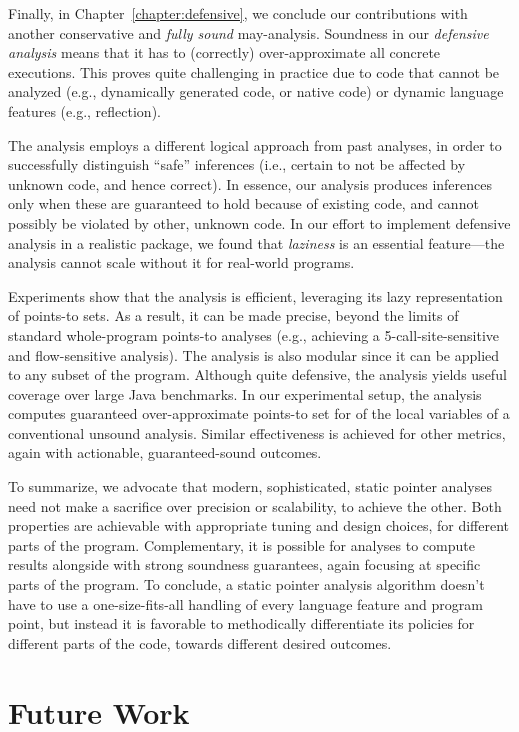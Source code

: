 Finally, in Chapter~\ref{chapter:defensive}, we conclude our contributions with another conservative and \emph{fully sound} may-analysis. Soundness in our \emph{defensive analysis} means that it has to (correctly) over-approximate all concrete executions. This proves quite challenging in practice due to code that cannot be analyzed (e.g., dynamically generated code, or native code) or dynamic language features (e.g., reflection).

The analysis employs a different logical approach from past analyses, in order to successfully distinguish ``safe'' inferences (i.e., certain to not be affected by unknown code, and hence correct).  In essence, our analysis produces inferences only when these are guaranteed to hold because of existing code, and cannot possibly be violated by other, unknown code. In our effort to implement defensive analysis in a realistic package, we found that \emph{laziness} is an essential feature---the analysis cannot scale without it for real-world programs.

Experiments show that the analysis is efficient, leveraging its lazy representation of points-to sets. As a result, it can be made precise, beyond the limits of standard whole-program points-to analyses (e.g., achieving a 5-call-site-sensitive and flow-sensitive analysis). The analysis is also modular since it can be applied to any subset of the program. Although quite defensive, the analysis yields useful coverage over large Java benchmarks. In our experimental setup, the analysis computes guaranteed over-approximate points-to set for  of the local variables of a conventional unsound analysis. Similar effectiveness is achieved for other metrics, again with actionable, guaranteed-sound outcomes.


To summarize, we advocate that modern, sophisticated, static pointer analyses need not make a sacrifice over precision or scalability, to achieve the other. Both properties are achievable with appropriate tuning and design choices, for different parts of the program. Complementary, it is possible for analyses to compute results alongside with strong soundness guarantees, again focusing at specific parts of the program. To conclude, a static pointer analysis algorithm doesn't have to use a one-size-fits-all handling of every language feature and program point, but instead it is favorable to methodically differentiate its policies for different parts of the code, towards different desired outcomes.


\section{Future Work}

